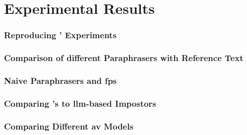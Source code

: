 \chapter{Experimental Results}
\label{chap:experimental_results}

\subsection{Reproducing \citet{koppel_determining_2014}' Experiments}



\subsection{Comparison of different Paraphrasers with Reference Text}

\subsection{Naive Paraphrasers and \acp{fp}}

\subsection{Comparing \citet{koppel_determining_2014}'s to \ac{llm}-based Impostors}

\subsection{Comparing Different \ac{av} Models}